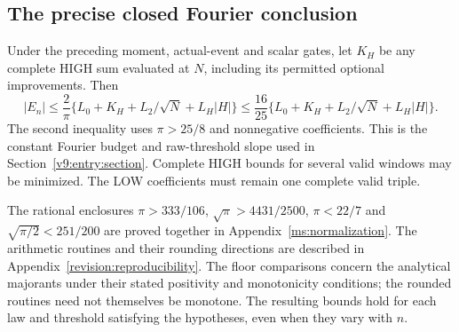 \subsection{The precise closed Fourier conclusion}

Under the preceding moment, actual-event and scalar gates, let $K_H$ be
any complete HIGH sum evaluated at $N$, including its permitted optional
improvements. Then
\begin{equation}\label{v9:fourier:conclusion}
 |E_n|\le\frac2\pi\{L_0+K_H+L_2/\sqrt N+L_H|H|\}
 \le\frac{16}{25}\{L_0+K_H+L_2/\sqrt N+L_H|H|\}.
\end{equation}
The second inequality uses $\pi>25/8$ and nonnegative coefficients.
This is the constant Fourier budget and raw-threshold slope used in
Section~\ref{v9:entry:section}. Complete HIGH bounds for several valid windows may be minimized.
The LOW coefficients must remain one complete valid triple.

The rational enclosures
$\pi>333/106$, $\sqrt\pi>4431/2500$, $\pi<22/7$ and
$\sqrt{\pi/2}<251/200$ are proved together in
Appendix~\ref{ms:normalization}. The arithmetic routines and their
rounding directions are described in Appendix~\ref{revision:reproducibility}.
The floor comparisons concern the analytical majorants under their
stated positivity and monotonicity conditions; the rounded routines
need not themselves be monotone. The resulting bounds hold for each
law and threshold satisfying the hypotheses, even when they vary with $n$.
